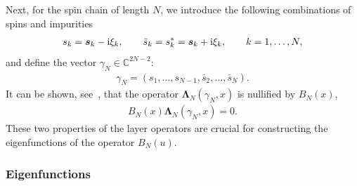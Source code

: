 Next, for the spin chain of length $N$, we introduce the following combinations of spins and impurities
\begin{gather*}
s_k=\boldsymbol s_k - {\rm i}\xi_k, \qquad
\bar s_k=s_k^*=\boldsymbol s_k + {\rm i}\xi_k, \qquad
k=1,\dots,N,
\end{gather*}
and define the vector $\gamma_N\in\mathbb C^{2N-2}$:
 \begin{gather}\label{definition:gammaN}
\gamma_N=(s_1,\dots, s_{N-1},\bar s_2,\dots, \bar s_N).
\end{gather}
It can be shown, see~\cite{Derkachov:2002tf}, that the operator $\boldsymbol\Lambda_{N}(\gamma_N,x)$ is nullified by $B_N(x)$,
\begin{gather}\label{BLambda=0}
B_N(x)\boldsymbol\Lambda_{N}(\gamma_N,x)=0.
\end{gather}
These two properties of the layer operators are crucial for constructing the eigenfunctions of the operator $B_N(u)$.


\subsubsection{Eigenfunctions}\label{sect:B-eigenfunctions}

